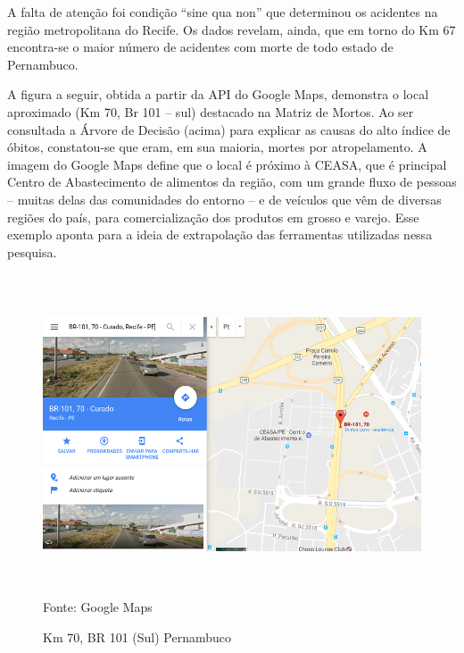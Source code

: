 \vspace{5mm}

A falta de atenção foi condição ``sine qua non'' que determinou os acidentes na região metropolitana do Recife. Os dados revelam, ainda, que em torno do Km 67 encontra-se o maior número de acidentes com morte de todo estado de Pernambuco.

\vspace{5mm}

A figura a seguir, obtida a partir da API do Google Maps, demonstra o local aproximado (Km 70, Br 101 -- sul) destacado na Matriz de Mortos. Ao ser consultada a Árvore de Decisão (acima) para explicar as causas do alto índice de óbitos, constatou-se que eram, em sua maioria, mortes por atropelamento. A imagem do Google Maps define que o local é próximo à CEASA, que é principal Centro de Abastecimento de alimentos da região, com um grande fluxo de pessoas -- muitas delas das comunidades do entorno -- e de veículos que vêm de diversas regiões do país, para comercialização dos produtos em grosso e varejo. Esse exemplo aponta para a ideia de extrapolação das ferramentas utilizadas nessa pesquisa.  

\pagebreak

\begin{figure}[htbp!]
	\centering
	\caption{Km 70, BR 101 (Sul) Pernambuco}
	\label{fig:Km70BR101}
	\includegraphics[width=150mm, height=95mm]{Figuras/Metodologia/Km70BR101}\\
	\tiny Fonte: Google Maps
\end{figure}

\vspace{7mm}

